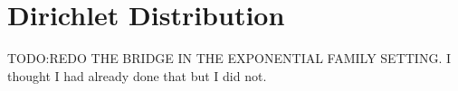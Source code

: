 \section{Dirichlet Distribution}

TODO:REDO THE BRIDGE IN THE EXPONENTIAL FAMILY SETTING. I thought I had already done that but I did not. 

